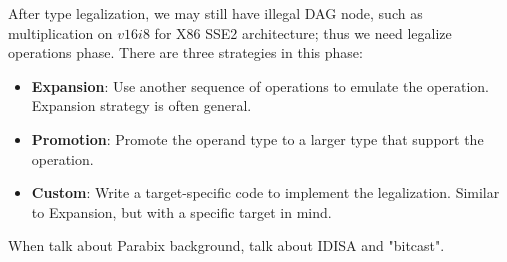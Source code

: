After type legalization, we may still have illegal DAG node, such as multiplication on $v16i8$ for X86 SSE2 architecture; thus we need legalize operations phase. There are three strategies in this phase:

\begin{itemize}
    \item \textbf{Expansion}: Use another sequence of operations to emulate the operation. Expansion strategy is often general.
    \item \textbf{Promotion}: Promote the operand type to a larger type that support the operation.
    \item \textbf{Custom}: Write a target-specific code to implement the legalization. Similar to Expansion, but with a specific target in mind.
\end{itemize}

When talk about Parabix background, talk about IDISA and "bitcast".
